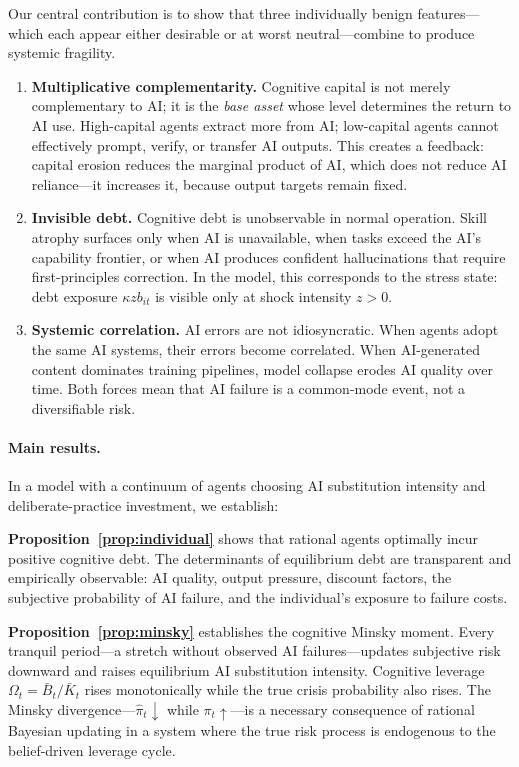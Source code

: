 \documentclass[12pt]{article}
\begin{document}
Our central contribution is to show that three individually benign features---which
each appear either desirable or at worst neutral---combine to produce systemic fragility.

\begin{enumerate}
\item \textbf{Multiplicative complementarity.} Cognitive capital is not merely
complementary to AI; it is the \emph{base asset} whose level determines the return
to AI use. High-capital agents extract more from AI; low-capital agents cannot
effectively prompt, verify, or transfer AI outputs. This creates a feedback: capital
erosion reduces the marginal product of AI, which does not reduce AI reliance---it
increases it, because output targets remain fixed.

\item \textbf{Invisible debt.} Cognitive debt is unobservable in normal operation.
Skill atrophy surfaces only when AI is unavailable, when tasks exceed the AI's
capability frontier, or when AI produces confident hallucinations that require
first-principles correction. In the model, this corresponds to the stress state:
debt exposure $\kappa z b_{it}$ is visible only at shock intensity $z > 0$.

\item \textbf{Systemic correlation.} AI errors are not idiosyncratic. When agents
adopt the same AI systems, their errors become correlated. When AI-generated content
dominates training pipelines, model collapse \citep{ShumailovEtAl2024} erodes AI
quality over time. Both forces mean that AI failure is a common-mode event, not a
diversifiable risk.
\end{enumerate}

\paragraph{Main results.} In a model with a continuum of agents choosing AI
substitution intensity and deliberate-practice investment, we establish:

\textbf{Proposition~\ref{prop:individual}} shows that rational agents optimally
incur positive cognitive debt. The determinants of equilibrium debt are transparent
and empirically observable: AI quality, output pressure, discount factors, the
subjective probability of AI failure, and the individual's exposure to failure costs.

\textbf{Proposition~\ref{prop:minsky}} establishes the cognitive Minsky moment.
Every tranquil period---a stretch without observed AI failures---updates subjective
risk downward and raises equilibrium AI substitution intensity. Cognitive leverage
$\Omega_t = \bar{B}_t / \bar{K}_t$ rises monotonically while the true crisis
probability also rises. The Minsky divergence---$\hat{\pi}_t \downarrow$ while
$\pi_t \uparrow$---is a necessary consequence of rational Bayesian updating in a
system where the true risk process is endogenous to the belief-driven leverage cycle.
\end{document}
